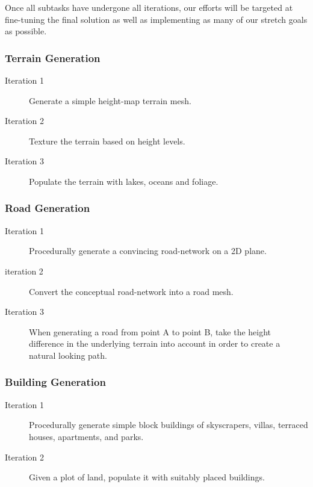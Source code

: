 Once all subtasks have undergone all iterations, our efforts will be targeted at fine-tuning the final solution as well as implementing as many of our stretch goals as possible.

\subsubsection{Terrain Generation}
\begin{description}
  \item[Iteration 1] Generate a simple height-map terrain mesh.
  \item[Iteration 2] Texture the terrain based on height levels.
  \item[Iteration 3] Populate the terrain with lakes, oceans and foliage.
\end{description}

\subsubsection{Road Generation}
\begin{description}
  \item[Iteration 1] Procedurally generate a convincing road-network on a 2D plane.
  \item[iteration 2] Convert the conceptual road-network into a road mesh.
  \item[Iteration 3] When generating a road from point A to point B, take the height difference in the underlying terrain into account in order to create a natural looking path.
\end{description}

\subsubsection{Building Generation}
\begin{description}
  \item[Iteration 1] Procedurally generate simple block buildings of skyscrapers, villas, terraced houses, apartments, and parks.
  \item[Iteration 2] Given a plot of land, populate it with suitably placed buildings.
\end{description}


